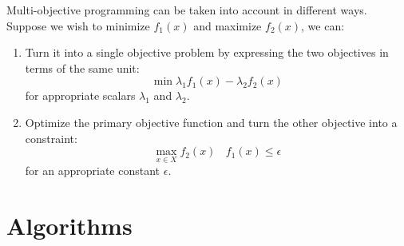 \documentclass[12pt, a4paper]{report}
\newtheorem[style=M,bodystyle=\normalfont]{proposition}{Proposition}
\newtheorem[style=M,bodystyle=\normalfont]{theorem}{Theorem}
\newtheorem[style=M,bodystyle=\normalfont]{corollary}{Corollary}
\newtheorem[style=M,bodystyle=\normalfont]{lemma}{Lemma}
\newtheorem[style=M,bodystyle=\normalfont]{definition}{Definition}
\begin{document}
    Multi-objective programming can be taken into account in different ways. Suppose we wish to minimize $f_1(x)$ and maximize $f_2(x)$, we can: 
    \begin{enumerate}
        \item Turn it into a single objective problem by expressing the two objectives in terms of the same unit: 
            \[\min{\lambda_1f_1(x)-\lambda_2f_2(x)}\]
            for appropriate scalars $\lambda_1$ and $\lambda_2$.
        \item Optimize the primary objective function and turn the other objective into a constraint: 
            \[\max_{x \in X}f_2(x) \:\:\:\: f_1(x)\leq \epsilon\]
            for an appropriate constant $\epsilon$. 
    \end{enumerate}

\newpage

\chapter{Algorithms}
\end{document}
